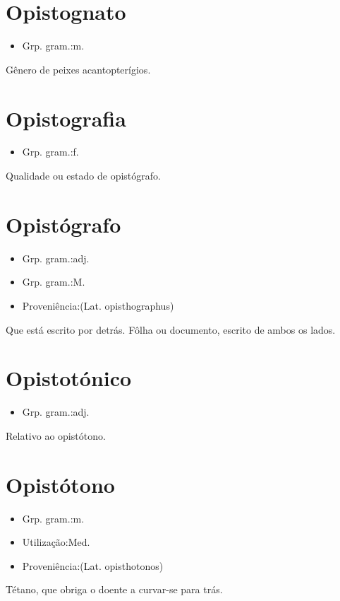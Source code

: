 \section{Opistognato}
\begin{itemize}
\item {Grp. gram.:m.}
\end{itemize}
Gênero de peixes acantopterígios.
\section{Opistografia}
\begin{itemize}
\item {Grp. gram.:f.}
\end{itemize}
Qualidade ou estado de opistógrafo.
\section{Opistógrafo}
\begin{itemize}
\item {Grp. gram.:adj.}
\end{itemize}
\begin{itemize}
\item {Grp. gram.:M.}
\end{itemize}
\begin{itemize}
\item {Proveniência:(Lat. \textunderscore opisthographus\textunderscore )}
\end{itemize}
Que está escrito por detrás.
Fôlha ou documento, escrito de ambos os lados.
\section{Opistotónico}
\begin{itemize}
\item {Grp. gram.:adj.}
\end{itemize}
Relativo ao opistótono.
\section{Opistótono}
\begin{itemize}
\item {Grp. gram.:m.}
\end{itemize}
\begin{itemize}
\item {Utilização:Med.}
\end{itemize}
\begin{itemize}
\item {Proveniência:(Lat. \textunderscore opisthotonos\textunderscore )}
\end{itemize}
Tétano, que obriga o doente a curvar-se para trás.
